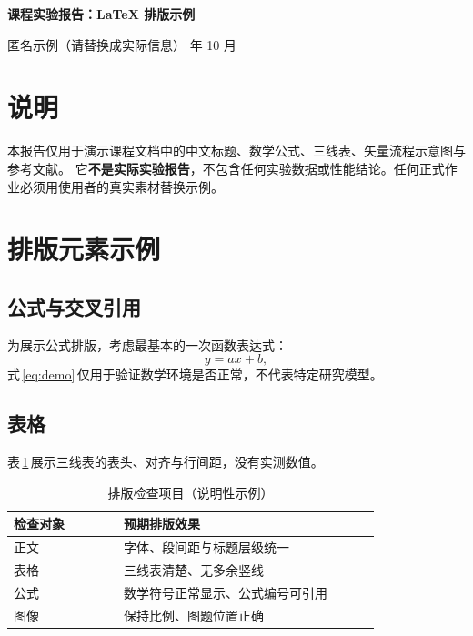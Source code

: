 \documentclass[UTF8,a4paper,11pt]{ctexart}
\begin{document}
\pagestyle{plain}
\begin{center}
  {\LARGE\bfseries 课程实验报告：\LaTeX{} 排版示例\par}
  \vspace{0.6em}
  {匿名示例（请替换成实际信息） 年 10 月\par}
\end{center}
\vspace{0.4em}

\section{说明}
本报告仅用于演示课程文档中的中文标题、数学公式、三线表、矢量流程示意图与参考文献。
它\textbf{不是实际实验报告}，不包含任何实验数据或性能结论。任何正式作业必须用使用者的真实素材替换示例。

\section{排版元素示例}
\subsection{公式与交叉引用}
为展示公式排版，考虑最基本的一次函数表达式：
\begin{equation}
 y = ax + b,\label{eq:demo}
\end{equation}
式\,\eqref{eq:demo}\,仅用于验证数学环境是否正常，不代表特定研究模型。

\subsection{表格}
表\,\ref{tab:demo}\,展示三线表的表头、对齐与行间距，没有实测数值。
\begin{table}[htbp]
  \centering
  \caption{排版检查项目（说明性示例）}
  \label{tab:demo}
  \begin{tabular}{p{0.24\linewidth}p{0.56\linewidth}}
    \toprule
    检查对象 & 预期排版效果 \\
    \midrule
    正文 & 字体、段间距与标题层级统一 \\
    表格 & 三线表清楚、无多余竖线 \\
    公式 & 数学符号正常显示、公式编号可引用 \\
    图像 & 保持比例、图题位置正确 \\
    \bottomrule
  \end{tabular}
\end{table}
\end{document}
